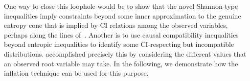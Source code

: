 \documentclass[aps,english,10pt,superscriptaddress,onecolumn,twoside,longbibliography,pra,floatfix,fleqn,nofootinbib]{revtex4-1}%
\newcommand*{\tpurp}[1]{{\color{Plum}{{#1}}}}
\theoremstyle{definition}
\newcommand{\aindep}{\ensuremath{\perp_d}} %
\begin{document}
One way to close this loophole would be to show that the novel Shannon-type inequalities imply constraints beyond some inner approximation to the genuine entropy cone that is implied by CI relations among the observed variables, perhaps along the lines of~\cite{weilenmann2016entropic}. Another is to use causal compatibility inequalities beyond entropic inequalities to identify some CI-respecting but incompatible distributions. \citet{pianaar2016interesting} accomplished precisely this
by considering the different values that an observed root variable may take. In the following, we demonstrate how the inflation technique can be used for this purpose. 

\end{document}
